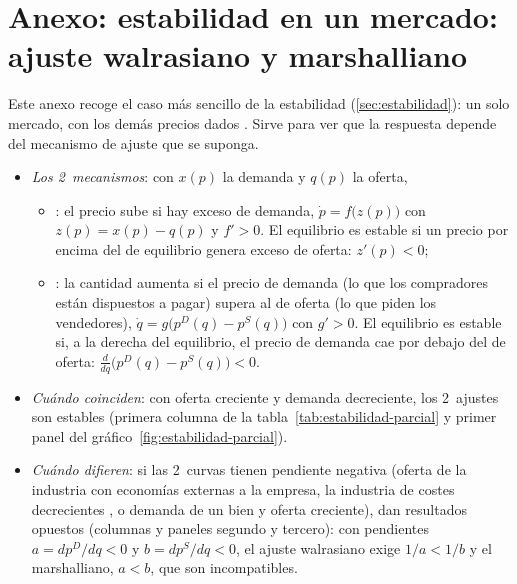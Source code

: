 \documentclass[11pt]{article}
\begin{document}
\section{Anexo: estabilidad en un mercado:\cortetitulo{} ajuste walrasiano y marshalliano}\label{anexo:estabilidad-parcial}

Este anexo recoge el caso más sencillo de la estabilidad (\ref{sec:estabilidad}): un solo mercado, con los demás precios dados . Sirve para ver que la respuesta depende del mecanismo de ajuste que se suponga.

\begin{itemize}
\item \emph{Los 2~mecanismos}: con $x(p)$ la demanda y $q(p)$ la oferta,
  \begin{itemize}
  \item {}: el precio sube si hay exceso de demanda, $\dot p=f\big(z(p)\big)$ con $z(p)=x(p)-q(p)$ y $f'>0$. El equilibrio es estable si un precio por encima del de equilibrio genera exceso de oferta: $z'(p)<0$;
  \item {}: la cantidad aumenta si el precio de demanda (lo que los compradores están dispuestos a pagar) supera al de oferta (lo que piden los vendedores), $\dot q=g\big(p^D(q)-p^S(q)\big)$ con $g'>0$. El equilibrio es estable si, a la derecha del equilibrio, el precio de demanda cae por debajo del de oferta: $\frac{d}{dq}\big(p^D(q)-p^S(q)\big)<0$.
  \end{itemize}
\item \emph{Cuándo coinciden}: con oferta creciente y demanda decreciente, los 2~ajustes son estables (primera columna de la tabla~\ref{tab:estabilidad-parcial} y primer panel del gráfico~\ref{fig:estabilidad-parcial}).
\item \emph{Cuándo difieren}: si las 2~curvas tienen pendiente negativa (oferta de la industria con economías externas a la empresa, la industria de costes decrecientes , o demanda de un bien  y oferta creciente), dan resultados opuestos (columnas y paneles segundo y tercero): con pendientes $a=dp^D/dq<0$ y $b=dp^S/dq<0$, el ajuste walrasiano exige $1/a<1/b$ y el marshalliano, $a<b$, que son incompatibles.
\end{itemize}
\end{document}
